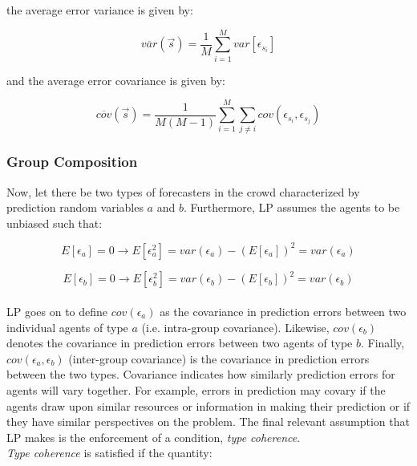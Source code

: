 \documentclass[twoside,twocolumn]{article}
\begin{document}
the average error variance is given by:

\begin{equation}
\label{var}
\overline{var}(\vec{s}) = \frac1M \sum_{i = 1}^M var[\epsilon_{s_i}]
\end{equation}

and the average error covariance is given by:

\begin{equation}
\label{cov}
\overline{cov}(\vec{s}) = \frac{1}{M(M-1)} \sum_{i = 1}^M \sum_{j \neq i}cov(\epsilon_{s_i}, \epsilon_{s_j})
\end{equation}

\subsubsection{Group Composition}

Now, let there be two types of forecasters in the crowd characterized by prediction random variables $a$ and $b$. Furthermore, LP assumes the agents to be unbiased such that:

\begin{equation}
\label{unbiaseda}
E[\epsilon_a] = 0 \rightarrow E[\epsilon_a^2] = var(\epsilon_a) - (E[\epsilon_a])^2 = var(\epsilon_a)
\end{equation}

\begin{equation}
\label{unbiasedb}
E[\epsilon_b] = 0 \rightarrow E[\epsilon_b^2] = var(\epsilon_b) - (E[\epsilon_b])^2 = var(\epsilon_b)
\end{equation}\\

LP goes on to define $cov(\epsilon_a)$ as the covariance in prediction errors between two individual agents of type $a$ (i.e. intra-group covariance). Likewise, $cov(\epsilon_b)$ denotes the covariance in prediction errors between two agents of type $b$. Finally, $cov(\epsilon_a, \epsilon_b)$ (inter-group covariance) is the covariance in prediction errors between the two types. Covariance indicates how similarly prediction errors for agents will vary together. For example, errors in prediction may covary if the agents draw upon similar resources or information in making their prediction or if they have similar perspectives on the problem. The final relevant assumption that LP makes is the enforcement of a condition, \textit{type coherence}.\\

\textit{Type coherence} is satisfied if the quantity:
\end{document}
